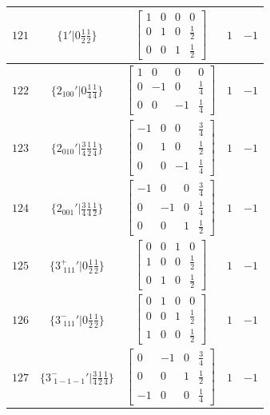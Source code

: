 \documentclass[fleqn,8pt]{jsarticle}
\begin{document}
\begin{longtable}{ccccc}
$ 121 $ & $ \{1{}'|0 \frac{1}{2} \frac{1}{2}\} $ & $ \begin{bmatrix} 1 & 0 & 0 & 0 \\ 0 & 1 & 0 & \frac{1}{2} \\ 0 & 0 & 1 & \frac{1}{2} \end{bmatrix} $ & $ 1 $ & $ -1 $ \\ \hline
$ 122 $ & $ \{2{}_{100}{}'|0 \frac{1}{4} \frac{1}{4}\} $ & $ \begin{bmatrix} 1 & 0 & 0 & 0 \\ 0 & -1 & 0 & \frac{1}{4} \\ 0 & 0 & -1 & \frac{1}{4} \end{bmatrix} $ & $ 1 $ & $ -1 $ \\ \hline
$ 123 $ & $ \{2{}_{010}{}'|\frac{3}{4} \frac{1}{2} \frac{1}{4}\} $ & $ \begin{bmatrix} -1 & 0 & 0 & \frac{3}{4} \\ 0 & 1 & 0 & \frac{1}{2} \\ 0 & 0 & -1 & \frac{1}{4} \end{bmatrix} $ & $ 1 $ & $ -1 $ \\ \hline
$ 124 $ & $ \{2{}_{001}{}'|\frac{3}{4} \frac{1}{4} \frac{1}{2}\} $ & $ \begin{bmatrix} -1 & 0 & 0 & \frac{3}{4} \\ 0 & -1 & 0 & \frac{1}{4} \\ 0 & 0 & 1 & \frac{1}{2} \end{bmatrix} $ & $ 1 $ & $ -1 $ \\ \hline
$ 125 $ & $ \{3^{+}_{\,\,111}{}'|0 \frac{1}{2} \frac{1}{2}\} $ & $ \begin{bmatrix} 0 & 0 & 1 & 0 \\ 1 & 0 & 0 & \frac{1}{2} \\ 0 & 1 & 0 & \frac{1}{2} \end{bmatrix} $ & $ 1 $ & $ -1 $ \\ \hline
$ 126 $ & $ \{3^{-}_{\,\,111}{}'|0 \frac{1}{2} \frac{1}{2}\} $ & $ \begin{bmatrix} 0 & 1 & 0 & 0 \\ 0 & 0 & 1 & \frac{1}{2} \\ 1 & 0 & 0 & \frac{1}{2} \end{bmatrix} $ & $ 1 $ & $ -1 $ \\ \hline
$ 127 $ & $ \{3^{-}_{\,\,1-1-1}{}'|\frac{3}{4} \frac{1}{2} \frac{1}{4}\} $ & $ \begin{bmatrix} 0 & -1 & 0 & \frac{3}{4} \\ 0 & 0 & 1 & \frac{1}{2} \\ -1 & 0 & 0 & \frac{1}{4} \end{bmatrix} $ & $ 1 $ & $ -1 $ \\ \hline

\end{longtable}
\end{document}
